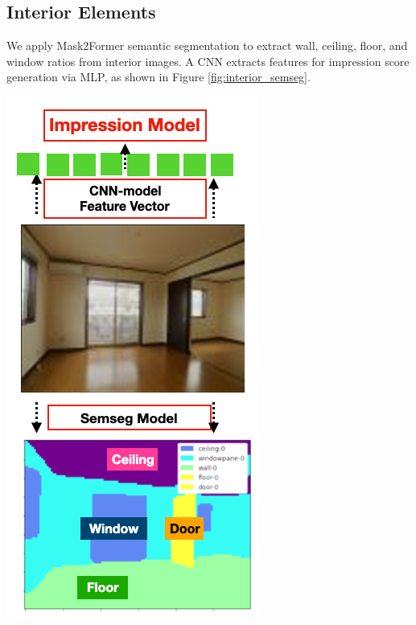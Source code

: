 \documentclass[11pt,a4paper]{article}
\begin{document}
\begin{multicols}{2}
\subsection{Interior Elements}
We apply Mask2Former semantic segmentation to extract wall, ceiling, floor, and window ratios from interior images. 
A CNN extracts features for impression score generation via MLP, as shown in Figure \ref{fig:interior_semseg}.


\begin{center}
    \includegraphics[width=0.6\columnwidth,height=1\columnwidth]{plots/exp_lv_semseg_4.png}
    \label{fig:interior_semseg}
\end{center}


\end{multicols}
\end{document}

